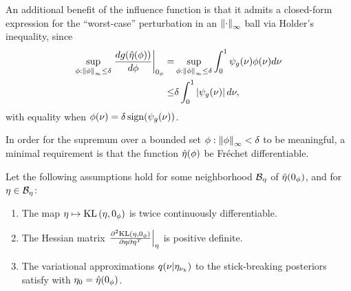 An additional benefit of the influence function is that it admits a closed-form
expression for the ``worst-case'' perturbation in an $\left\Vert\cdot\right\Vert_{\infty}$ ball
via Holder's inequality, since
%
\begin{align*}
%
\sup_{\phi: \norminf{\phi} \le \delta}
    \fracat{d g(\etaopt(\phi))}{d \phi}{\phiz} =&{}
\sup_{\phi: \norminf{\phi} \le \delta}
    \int_0^1 \inflg(\nu) \phi(\nu) d\nu \\
\le&{} \delta \int_0^1 \abs{\inflg(\nu) }d\nu,
%
\end{align*}
%
with equality when $\phi(\nu) = \delta \, \mathrm{sign}(\psi_{g}(\nu))$.

In order for the supremum over a bounded set $\phi: \left\Vert\phi\right\Vert_{\infty} < \delta$
to be meaningful, a minimal requirement is that the function $\hat\eta(\phi)$
be Fr{\'e}chet differentiable.

\begin{assu}
%
Let the following assumptions hold for some neighborhood $\mathcal{B}_\eta$
of $\hat\eta(0_\phi)$, and for $\eta \in \mathcal{B}_\eta$:
%
\begin{enumerate}
%
    \item {}
    The map $\eta \mapsto \mathrm{KL}\left(\eta, 0_\phi\right)$ is twice
    continuously differentiable.
%
\item{}
    The Hessian matrix $\left.\frac{\partial^2 \mathrm{KL}\left(\eta, 0_\phi\right)}{\partial \eta \partial \eta^T}\right\vert_{\eta}$ is positive definite.%
\item{} The variational approximations $q(\nu
\vert \eta_{\nu_{k}})$ to the stick-breaking posteriors satisfy 
with $\eta_0 = \hat\eta(0_\phi)$.
%
\end{enumerate}
%
\end{assu}


